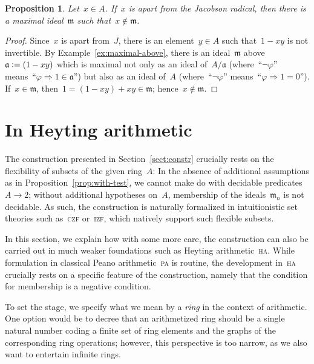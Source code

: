 \documentclass[oneside,reqno]{amsart}
\theoremstyle{definition}
\theoremstyle{plain}
\newtheorem{prop}[defn]{Proposition}
\theoremstyle{remark}
\newcommand{\aaa}{\mathfrak{a}}
\newcommand{\mmm}{\mathfrak{m}}
\newcommand{\defeq}{\vcentcolon=}
\renewcommand{\_}{\mathpunct{.}\,}
\begin{document}
\begin{prop}Let~$x \in A$. If~$x$ is apart from the Jacobson radical, then
there is a maximal ideal~$\mmm$ such that~$x \not\in \mmm$.
\end{prop}

\begin{proof}Since~$x$ is apart from~$J$, there is an element~$y \in A$ such that~$1-xy$
is not invertible. By Example~\ref{ex:maximal-above}, there is an ideal~$\mmm$
above~$\aaa \defeq (1-xy)$ which is maximal not only as an ideal of~$A/\aaa$
(where~``$\neg\varphi$'' means~``$\varphi \Rightarrow 1 \in \aaa$'') but also as an
ideal of~$A$ (where~``$\neg\varphi$'' means~``$\varphi \Rightarrow 1 = 0$''). If~$x
\in \mmm$, then~$1 = (1-xy) + xy \in \mmm$; hence~$x \not\in \mmm$.
\end{proof}


\section{In Heyting arithmetic}
\label{sect:arithmetization}

The construction presented in Section~\ref{sect:constr} crucially rests on the
flexibility of subsets of the given ring~$A$: In the absence of additional
assumptions as in Proposition~\ref{prop:with-test},
we cannot make do with decidable
predicates~$A \to 2$; without additional hypotheses on~$A$, membership of the
ideals~$\mmm_n$ is not decidable. As such, the construction is
naturally formalized in intuitionistic set theories such as~\textsc{czf}
or~\textsc{izf}, which natively support such flexible subsets.

In this section, we explain how with some more care, the construction can also
be carried out in much weaker foundations such as Heyting
arithmetic~\textsc{ha}. While formulation in classical Peano arithmetic~\textsc{pa}
is routine, the development in~\textsc{ha} crucially rests on a specific
feature of the construction, namely that the condition for membership is a
negative condition.

To set the stage, we specify what we mean by a \emph{ring} in the context of
arithmetic. One option would be to decree that an arithmetized ring should be a single
natural number coding a finite set of ring elements and the graphs of the
corresponding ring operations; however, this perspective is too narrow, as we
also want to entertain infinite rings.
\end{document}
